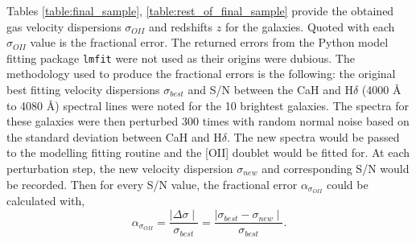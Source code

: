 \documentclass[12pt, twocolumn, nofootinbib]{revtex4-1}    %
\begin{document}
Tables \ref{table:final_sample}, \ref{table:rest_of_final_sample} provide the obtained gas velocity dispersions $\sigma_{OII}$ and redshifts $z$ for the galaxies. Quoted with each $\sigma_{OII}$ value is the fractional error. The returned errors from the Python model fitting package \texttt{lmfit} \citep{newville_matthew_2014_11813} were not used as their origins were dubious. The methodology used to produce the fractional errors is the following: the original best fitting velocity dispersions $\sigma_{best}$ and S/N between the CaH and H$\delta$ (4000 {\AA} to 4080 {\AA}) spectral lines were noted for the 10 brightest galaxies. The spectra for these galaxies were then perturbed 300 times with random normal noise based on the standard deviation between CaH and H$\delta$. The new spectra would be passed to the modelling fitting routine and the [OII] doublet would be fitted for. At each perturbation step, the new velocity dispersion $\sigma_{new}$ and corresponding S/N would be recorded. Then for every S/N value, the fractional error $\alpha_{\sigma_{OII}}$ could be calculated with, 
\begin{equation}
    \alpha_{\sigma_{OII}}=\frac{\mid \Delta \sigma \mid}{\sigma_{best}}=\frac{\mid \sigma_{best}-\sigma_{new} \mid}{\sigma_{best}}.
    \label{eqn:frac_error}
\end{equation}
\end{document}
